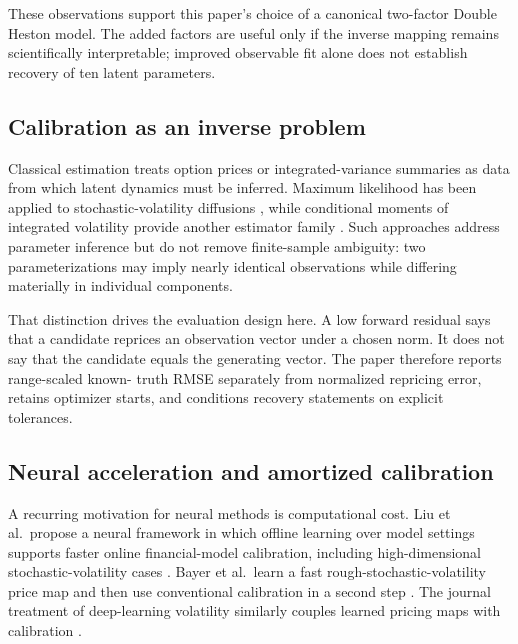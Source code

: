 These observations support this paper's choice of a canonical two-factor Double Heston
model. The added factors are useful only if the inverse mapping remains scientifically
interpretable; improved observable fit alone does not establish recovery of ten latent
parameters.

\subsection{Calibration as an inverse problem}
\label{subsec:literature-calibration-identifiability}

Classical estimation treats option prices or integrated-variance summaries as data from
which latent dynamics must be inferred. Maximum likelihood has been applied to
stochastic-volatility diffusions \citep{aitsahalia2007maximum}, while conditional
moments of integrated volatility provide another estimator family
\citep{bollerslev2002estimating}. Such approaches address parameter inference but do not
remove finite-sample ambiguity: two parameterizations may imply nearly identical
observations while differing materially in individual components.

That distinction drives the evaluation design here. A low forward residual says that a
candidate reprices an observation vector under a chosen norm. It does not say that the
candidate equals the generating vector. The paper therefore reports range-scaled known-
truth RMSE separately from normalized repricing error, retains optimizer starts, and
conditions recovery statements on explicit tolerances.

\subsection{Neural acceleration and amortized calibration}
\label{subsec:literature-neural-calibration}

A recurring motivation for neural methods is computational cost. Liu et al.\ propose a
neural framework in which offline learning over model settings supports faster online
financial-model calibration, including high-dimensional stochastic-volatility cases
\citep{liu2019neural}. Bayer et al.\ learn a fast rough-stochastic-volatility price map
and then use conventional calibration in a second step \citep{bayer2019deep}. The
journal treatment of deep-learning volatility similarly couples learned pricing maps
with calibration \citep{horvath2021deep}.

